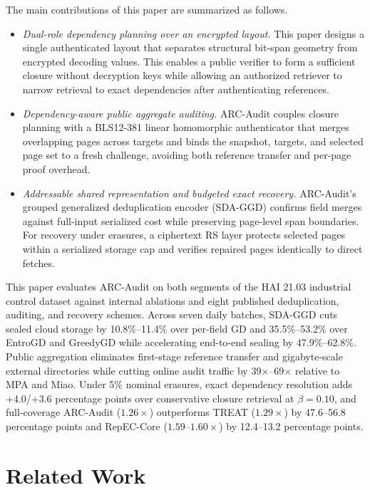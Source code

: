 \documentclass[10pt,journal]{IEEEtran}
\begin{document}
The main contributions of this paper are summarized as follows.
\begin{itemize}
\item \emph{Dual-role dependency planning over an encrypted layout.} This paper designs a single authenticated layout that separates structural bit-span geometry from encrypted decoding values. This enables a public verifier to form a sufficient closure without decryption keys while allowing an authorized retriever to narrow retrieval to exact dependencies after authenticating references.
\item \emph{Dependency-aware public aggregate auditing.} ARC-Audit couples closure planning with a BLS12-381 linear homomorphic authenticator that merges overlapping pages across targets and binds the snapshot, targets, and selected page set to a fresh challenge, avoiding both reference transfer and per-page proof overhead.
\item \emph{Addressable shared representation and budgeted exact recovery.} ARC-Audit's grouped generalized deduplication encoder (SDA-GGD) confirms field merges against full-input serialized cost while preserving page-level span boundaries. For recovery under erasures, a ciphertext RS layer protects selected pages within a serialized storage cap and verifies repaired pages identically to direct fetches.
\end{itemize}

This paper evaluates ARC-Audit on both segments of the HAI 21.03 industrial control dataset against internal ablations and eight published deduplication, auditing, and recovery schemes. Across seven daily batches, SDA-GGD cuts sealed cloud storage by 10.8\%--11.4\% over per-field GD and 35.5\%--53.2\% over EntroGD and GreedyGD while accelerating end-to-end sealing by 47.9\%--62.8\%. Public aggregation eliminates first-stage reference transfer and gigabyte-scale external directories while cutting online audit traffic by 39$\times$--69$\times$ relative to MPA and Miao. Under 5\% nominal erasures, exact dependency resolution adds +4.0/+3.6 percentage points over conservative closure retrieval at $\beta{=}0.10$, and full-coverage ARC-Audit ($1.26\times$) outperforms TREAT ($1.29\times$) by 47.6--56.8 percentage points and RepEC-Core ($1.59$--$1.60\times$) by 12.4--13.2 percentage points.
\section{Related Work}
\end{document}
